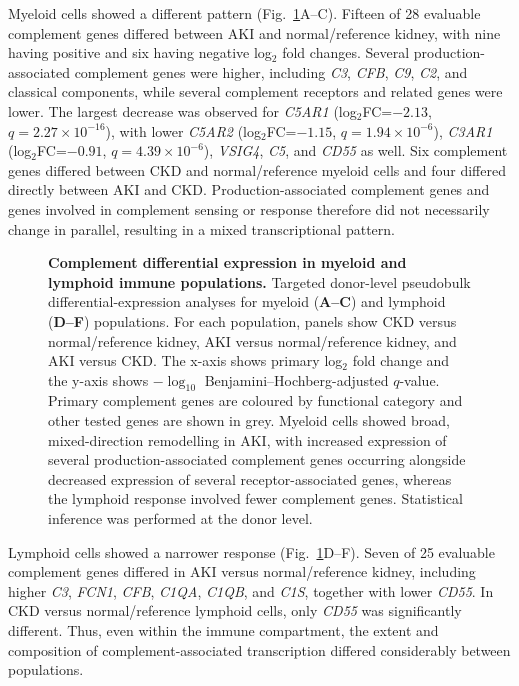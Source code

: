 \documentclass[10pt,letterpaper]{article}
\begin{document}
Myeloid cells showed a different pattern (Fig.~\ref{fig:immune_de}A--C). Fifteen of 28 evaluable complement genes differed between AKI and normal/reference kidney, with nine having positive and six having negative log$_2$ fold changes. Several production-associated complement genes were higher, including \textit{C3}, \textit{CFB}, \textit{C9}, \textit{C2}, and classical components, while several complement receptors and related genes were lower. The largest decrease was observed for \textit{C5AR1} (log$_2$FC=$-2.13$, $q=2.27\times10^{-16}$), with lower \textit{C5AR2} (log$_2$FC=$-1.15$, $q=1.94\times10^{-6}$), \textit{C3AR1} (log$_2$FC=$-0.91$, $q=4.39\times10^{-6}$), \textit{VSIG4}, \textit{C5}, and \textit{CD55} as well. Six complement genes differed between CKD and normal/reference myeloid cells and four differed directly between AKI and CKD. Production-associated complement genes and genes involved in complement sensing or response therefore did not necessarily change in parallel, resulting in a mixed transcriptional pattern.

\begin{figure}[!h]
\caption{\textbf{Complement differential expression in myeloid and lymphoid immune populations.}
Targeted donor-level pseudobulk differential-expression analyses for myeloid (\textbf{A--C}) and lymphoid (\textbf{D--F}) populations. For each population, panels show CKD versus normal/reference kidney, AKI versus normal/reference kidney, and AKI versus CKD. The x-axis shows primary log$_2$ fold change and the y-axis shows $-\log_{10}$ Benjamini--Hochberg-adjusted $q$-value. Primary complement genes are coloured by functional category and other tested genes are shown in grey. Myeloid cells showed broad, mixed-direction remodelling in AKI, with increased expression of several production-associated complement genes occurring alongside decreased expression of several receptor-associated genes, whereas the lymphoid response involved fewer complement genes. Statistical inference was performed at the donor level.}
\label{fig:immune_de}
\end{figure}

Lymphoid cells showed a narrower response (Fig.~\ref{fig:immune_de}D--F). Seven of 25 evaluable complement genes differed in AKI versus normal/reference kidney, including higher \textit{C3}, \textit{FCN1}, \textit{CFB}, \textit{C1QA}, \textit{C1QB}, and \textit{C1S}, together with lower \textit{CD55}. In CKD versus normal/reference lymphoid cells, only \textit{CD55} was significantly different. Thus, even within the immune compartment, the extent and composition of complement-associated transcription differed considerably between populations.
\end{document}
